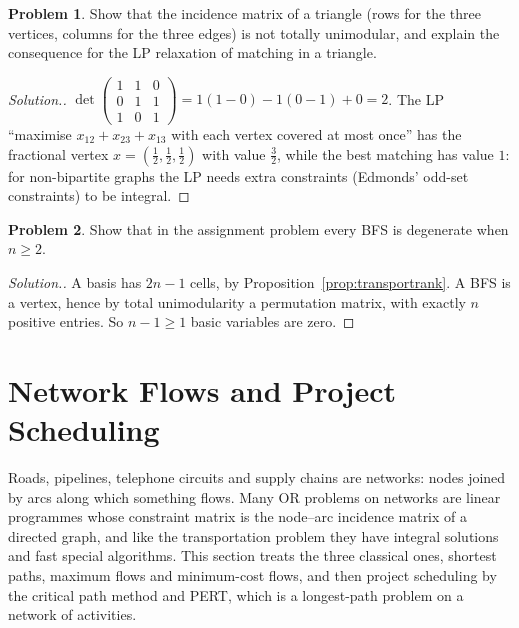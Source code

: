 \documentclass[11pt,a4paper]{article}
\numberwithin{equation}{section}
\theoremstyle{definition}
\newtheorem{problemx}{Problem}[subsection]
\newenvironment{problem}{\begin{problemx}}{\end{problemx}}
\newenvironment{solution}
  {\renewcommand{\qedsymbol}{}\begin{proof}[\textit{Solution}.]}
  {\end{proof}}
\begin{document}
\begin{problem}
Show that the incidence matrix of a triangle (rows for the three vertices, columns for the three edges) is not totally unimodular, and explain the consequence for the LP relaxation of matching in a triangle.
\end{problem}

\begin{solution}
$\det\begin{pmatrix} 1 & 1 & 0 \\ 0 & 1 & 1 \\ 1 & 0 & 1 \end{pmatrix} = 1(1 - 0) - 1(0 - 1) + 0 = 2$. The LP ``maximise $x_{12} + x_{23} + x_{13}$ with each vertex covered at most once'' has the fractional vertex $x = (\frac12, \frac12, \frac12)$ with value $\frac32$, while the best matching has value $1$: for non-bipartite graphs the LP
needs extra constraints (Edmonds' odd-set constraints) to be integral.
\end{solution}

\begin{problem}
Show that in the assignment problem every BFS is degenerate when $n \geq 2$.
\end{problem}

\begin{solution}
A basis has $2n - 1$ cells, by Proposition~\ref{prop:transportrank}. A BFS is a vertex, hence by total unimodularity a permutation matrix, with exactly $n$ positive entries. So $n - 1 \geq 1$ basic variables are zero.
\end{solution}

\section{Network Flows and Project Scheduling}
\label{sec:networks}

Roads, pipelines, telephone circuits and supply chains are networks: nodes joined by arcs along which something flows. Many OR problems on networks are linear programmes whose constraint matrix is the node--arc incidence matrix of a directed graph, and like the transportation problem they have integral solutions and fast special
algorithms. This section treats the three classical ones, shortest paths, maximum flows and minimum-cost flows, and then project scheduling by the critical path method and PERT, which is a longest-path problem on a network of activities.
\end{document}
